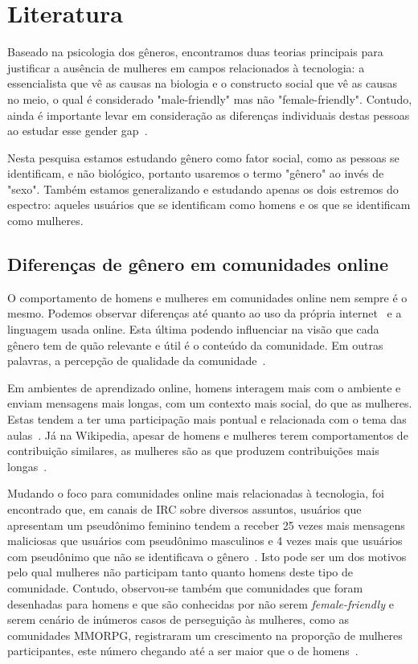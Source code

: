 \chapter{Literatura}

Baseado na psicologia dos gêneros, encontramos duas teorias principais para justificar a ausência de mulheres em campos relacionados à tecnologia: a essencialista que vê as causas na biologia e o constructo social que vê as causas no meio, o qual é considerado "male-friendly" mas não "female-friendly". Contudo, ainda é importante levar em consideração as diferenças individuais destas pessoas ao estudar esse gender gap~\cite{trauth2004understanding}.

Nesta pesquisa estamos estudando gênero como fator social, como as pessoas se identificam, e não biológico, portanto usaremos o termo "gênero" ao invés de "sexo". Também estamos generalizando e estudando apenas os dois estremos do espectro: aqueles usuários que se identificam como homens e os que se identificam como mulheres. 

\section{Diferenças de gênero em comunidades online}

O comportamento de homens e mulheres em comunidades online nem sempre é o mesmo. Podemos observar diferenças até quanto ao uso da própria internet~\cite{hargittai2006differences} e a linguagem usada online. Esta última podendo influenciar na visão que cada gênero tem  de quão relevante e útil é o conteúdo da comunidade. Em outras palavras, a percepção de qualidade da comunidade~\cite{Gefen:2005:YSS:1066149.1066156}.

Em ambientes de aprendizado online, homens interagem mais com o ambiente e enviam mensagens mais longas, com um contexto mais social, do que as mulheres. Estas tendem a ter uma participação mais pontual e relacionada com o tema das aulas~\cite{barrett1999gender}. Já na Wikipedia, apesar de homens e mulheres terem comportamentos de contribuição similares, as mulheres são as que produzem contribuições mais longas~\cite{glott2010wikipedia}.

Mudando o foco para comunidades online mais relacionadas à tecnologia, foi encontrado que, em canais de IRC sobre diversos assuntos, usuários que apresentam um pseudônimo feminino tendem a receber 25 vezes mais mensagens maliciosas que usuários com pseudônimo masculinos e 4 vezes mais que usuários com pseudônimo que não se identificava o gênero~\cite{meyer2006assessing}. Isto pode ser um dos motivos pelo qual mulheres não participam tanto quanto homens deste tipo de comunidade. Contudo, observou-se também que comunidades que foram desenhadas para homens e que são conhecidas por não serem \textit{female-friendly} e serem cenário de inúmeros casos de perseguição às mulheres, como as comunidades MMORPG, registraram um crescimento na proporção de mulheres participantes, este número chegando até a ser maior que o de homens~\cite{taylor2003multiple}. 

